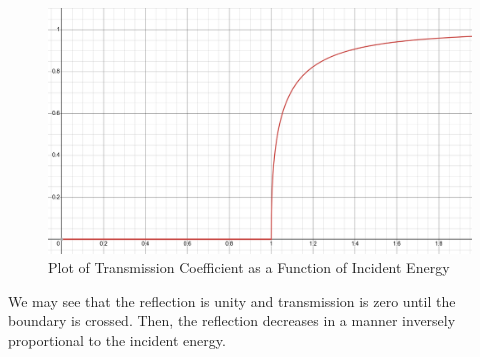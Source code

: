 \begin{enumerate}
\begin{enumerate}
          \begin{figure}[H]
            \centering
            \includegraphics[width=.8\textwidth]{Figures/HW6-3b}
            \caption{Plot of Transmission Coefficient as a Function of Incident Energy}
            \label{fig:2}
          \end{figure}

          We may see that the reflection is unity and transmission is zero until the boundary is crossed. Then, the reflection decreases in a manner inversely proportional to the incident energy.

    \end{enumerate}

\end{enumerate}



